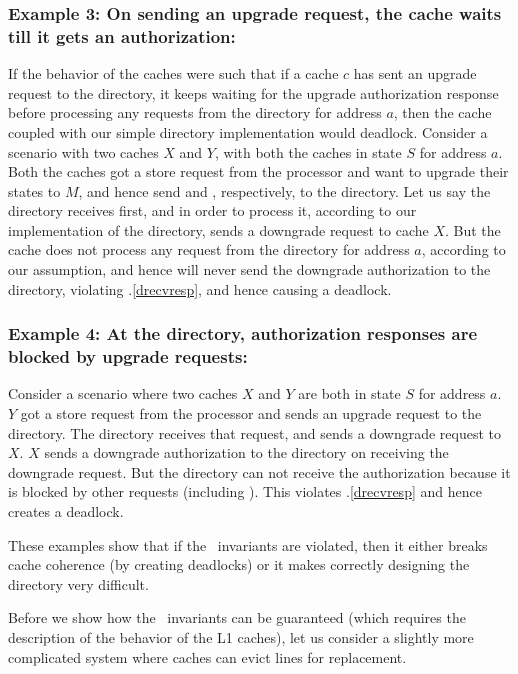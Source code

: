 \subsubsection*{Example 3: On sending an upgrade request, the cache waits till
it gets an authorization:}
If the behavior of the caches were such that if a cache $c$ has sent an
upgrade request  to the directory, it keeps waiting for the
upgrade authorization response  before processing any
requests from the directory for address $a$, then the cache coupled with our
simple directory implementation would deadlock. Consider a scenario with two
caches $X$ and $Y$, with both the caches in state $S$ for address $a$. Both the
caches got a store request from the processor and want to upgrade their states
to $M$, and hence send  and , respectively,
to the directory. Let us say the directory receives  first,
and in order to process it, according to our implementation of the directory,
sends a downgrade request  to cache $X$. But the cache 
does not process any request from the directory for address $a$, according to
our assumption, and hence will never send the downgrade authorization
 to the directory, violating \FirstInv.\ref{drecvresp}, and
hence causing a deadlock.

\subsubsection*{Example 4: At the directory, authorization responses are blocked
by upgrade requests:}
Consider a scenario where two caches $X$ and $Y$ are both in state $S$ for address
$a$. $Y$ got a store request from the processor and sends an upgrade request
 to the directory. The directory receives that request, and
sends a downgrade request  to $X$. $X$ sends a downgrade
authorization  to the directory on receiving the downgrade
request. But the directory can not receive the authorization because it is
blocked by other requests (including ). This violates
\FirstInv.\ref{drecvresp} and hence creates a deadlock.

These examples show that if the \FirstInv\ invariants are violated, then it
either breaks cache coherence (by creating deadlocks) or it makes correctly
designing the directory very difficult.

Before we show how the \FirstInv\ invariants can be guaranteed (which requires
the description of the behavior of the L1 caches), let us consider a
slightly more complicated system where caches can evict lines for replacement.

